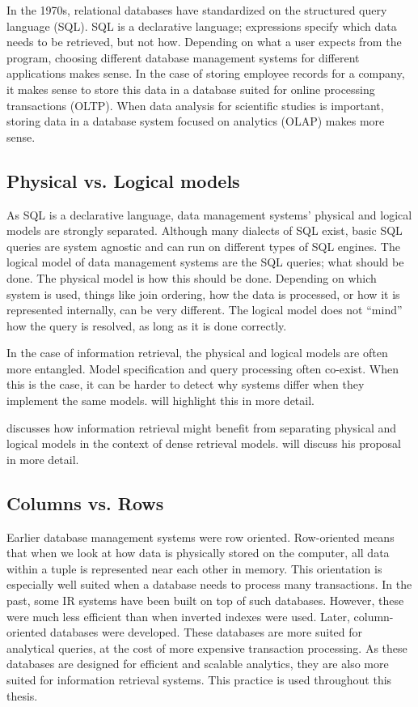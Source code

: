 In the 1970s, relational databases have standardized on the structured query language (SQL).  
SQL is a declarative language; expressions specify which data needs to be retrieved, but not how. Depending on what a user expects from the program, choosing different database management systems for different applications makes sense. In the case of storing employee records for a company, it makes sense to store this data in a database suited for online processing transactions (OLTP). When data analysis for scientific studies is important, storing data in a database system focused on analytics (OLAP) makes more sense.

\subsection{Physical vs. Logical models}
As SQL is a declarative language, data management systems' physical and logical models are strongly separated. Although many dialects of SQL exist, basic SQL queries are system agnostic and can run on different types of SQL engines. The logical model of data management systems are the SQL queries; what should be done. The physical model is how this should be done. Depending on which system is used, things like join ordering, how the data is processed, or how it is represented internally, can be very different. The logical model does not ``mind'' how the query is resolved, as long as it is done correctly. 

In the case of information retrieval, the physical and logical models are often more entangled. Model specification and query processing often co-exist. When this is the case, it can be harder to detect why systems differ when they implement the same models.  will highlight this in more detail. 

\citet{seperation-logical-physical} discusses how information retrieval might benefit from separating physical and logical models in the context of dense retrieval models.  will discuss his proposal in more detail.

\subsection{Columns vs. Rows}
Earlier database management systems were row oriented. Row-oriented means that when we look at how data is physically stored on the computer, all data within a tuple is represented near each other in memory. This orientation is especially well suited when a database needs to process many transactions. In the past, some IR systems have been built on top of such databases. However, these were much less efficient than when inverted indexes were used. Later, column-oriented databases were developed. These databases are more suited for analytical queries, at the cost of more expensive transaction processing. As these databases are designed for efficient and scalable analytics, they are also more suited for information retrieval systems. This practice is used throughout this thesis. 

